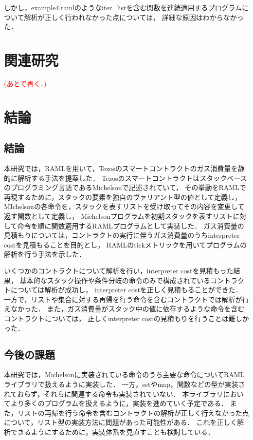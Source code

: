 \documentclass{kuisthesis}
\begin{document}
しかし，example4.ramlのようなiter\_listを含む関数を連続適用するプログラムについて解析が正しく行われなかった点については，
詳細な原因はわからなかった．

\section{関連研究} \label{sec-relate}
\textcolor{red}{(あとで書く．)}

\section{結論}\label{sec-conclusion}
\subsection{結論} \label{subsec-conclusion-conclusion}
本研究では，RAMLを用いて，Tezosのスマートコントラクトのガス消費量を静的に解析する手法を提案した．
Tezosのスマートコントラクトはスタックベースのプログラミング言語であるMichelsonで記述されていて，
その挙動をRAMLで再現するために，スタックの要素を独自のヴァリアント型の値として定義し，
MIchelsonの各命令を，スタックを表すリストを受け取ってその内容を変更して返す関数として定義し，
Michelsonプログラムを初期スタックを表すリストに対して命令を順に関数適用するRAMLプログラムとして実装した．
ガス消費量の見積もりについては，コントラクトの実行に伴うガス消費量のうちinterpreter costを見積もることを目的とし，
RAMLのtickメトリックを用いてプログラムの解析を行う手法を示した．

いくつかのコントラクトについて解析を行い，interpreter costを見積もった結果，
基本的なスタック操作や条件分岐の命令のみで構成されているコントラクトについては解析が成功し，
interpreter costを正しく見積もることができた．
一方で，リストや集合に対する再帰を行う命令を含むコントラクトでは解析が行えなかった．
また，ガス消費量がスタック中の値に依存するような命令を含むコントラクトについては，
正しくinterpreter costの見積もりを行うことは難しかった．

\subsection{今後の課題} \label{subsec-conclusion-work}
本研究では，Michelsonに実装されている命令のうち主要な命令についてRAMLライブラリで扱えるように実装した．
一方，setやmap，関数などの型が実装されておらず，それらに関連する命令も実装されていない．
本ライブラリにおいてより多くのプログラムを扱えるように，実装を進めていく予定である．
また，リストの再帰を行う命令を含むコントラクトの解析が正しく行えなかった点について，リスト型の実装方法に問題があった可能性がある．
これを正しく解析できるようにするために，実装体系を見直すことも検討している．
\end{document}
